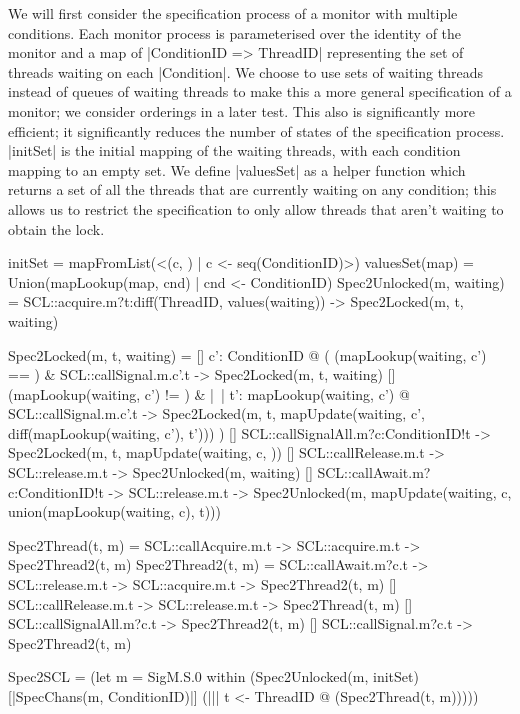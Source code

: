 We will first consider the specification process of a monitor with multiple conditions. Each  monitor process is parameterised over the identity of the monitor and a map of |ConditionID => {ThreadID}| representing the set of threads waiting on each |Condition|. We choose to use sets of waiting threads instead of queues of waiting threads to make this a more general specification of a monitor; we consider orderings in a later test. This also is significantly more efficient; it significantly reduces the number of states of the specification process. |initSet| is the initial mapping of the waiting threads, with each condition mapping to an empty set. We define |valuesSet| as a helper function which returns a set of all the threads that are currently waiting on any condition; this allows us to restrict the specification to only allow threads that aren't waiting to obtain the lock. 

\begin{cspm}
initSet = mapFromList(<(c, {}) | c <- seq(ConditionID)>)
valuesSet(map) = Union({mapLookup(map, cnd) | cnd <- ConditionID})
Spec2Unlocked(m, waiting) = 
  SCL::acquire.m?t:diff(ThreadID, values(waiting)) -> Spec2Locked(m, t, waiting)

Spec2Locked(m, t, waiting) =
  [] c': ConditionID @  
      (   
          (mapLookup(waiting, c') == {}) & SCL::callSignal.m.c'.t ->
             Spec2Locked(m, t, waiting)
       [] (mapLookup(waiting, c') != {}) & 
            |~| t': mapLookup(waiting, c') @ SCL::callSignal.m.c'.t -> 
                Spec2Locked(m, t, 
                            mapUpdate(waiting, c', diff(mapLookup(waiting, c'), {t'})))            
      )
  [] SCL::callSignalAll.m?c:ConditionID!t -> 
            Spec2Locked(m, t, mapUpdate(waiting, c, {}))
  [] SCL::callRelease.m.t -> SCL::release.m.t ->
        Spec2Unlocked(m, waiting)
  [] SCL::callAwait.m?c:ConditionID!t -> SCL::release.m.t ->
        Spec2Unlocked(m, mapUpdate(waiting, c, union(mapLookup(waiting, c), {t})))


Spec2Thread(t, m) = SCL::callAcquire.m.t -> SCL::acquire.m.t -> Spec2Thread2(t, m)
Spec2Thread2(t, m) = 
     SCL::callAwait.m?c.t -> SCL::release.m.t -> SCL::acquire.m.t -> Spec2Thread2(t, m)
  [] SCL::callRelease.m.t -> SCL::release.m.t -> Spec2Thread(t, m)
  [] SCL::callSignalAll.m?c.t -> Spec2Thread2(t, m)
  [] SCL::callSignal.m?c.t -> Spec2Thread2(t, m)

Spec2SCL = (let m = SigM.S.0 within 
  (Spec2Unlocked(m, initSet) [|SpecChans(m, ConditionID)|]
      (||| t <- ThreadID @ (Spec2Thread(t, m)))))
  \end{cspm}

